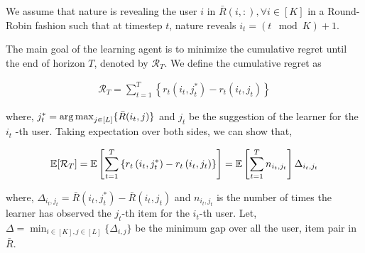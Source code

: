 \begin{assumption}
\label{assm:round-robin}
We assume that nature is revealing the user $i$ in $\bar{R}(i,:), \forall i\in [K]$  in a Round-Robin fashion such that at timestep $t$, nature reveals $i_t = (t \mod K) + 1$.
\end{assumption}

The main goal of the learning agent is to minimize the cumulative regret until the end of horizon $T$, denoted by $\mathcal{R}_T$. We define the cumulative regret as 

\begin{align*}
\mathcal{R}_T = \sum_{t=1}^{T}\left\lbrace r_{t}\left(i_t, j^*_t \right) - r_{t}\left( i_t, j_{t}\right)\right\rbrace
\end{align*}

where, $j^*_t = \mathop{\rm arg\,max}_{j\in [L]}\lbrace \bar{R}(i_t,j)\rbrace$ and $j_t$ be the suggestion of the learner for the $i_t$ -th user. Taking expectation over both sides, we can show that,

\begin{align*}
\mathbb{E}[\mathcal{R}_T] = \mathbb{E}\left [ \sum_{t=1}^{T}\left\lbrace r_{t}\left(i_t, j^*_t \right) - r_{t}\left( i_t, j_{t}\right)\right\rbrace\right] = \mathbb{E}\left [ \sum_{t=1}^{T}  n_{i_t,j_t} \right ]\Delta_{i_t,j_t}
\end{align*}

where, $\Delta_{i_t,j_t} = \bar{R}(i_t,j^*_t) - \bar{R}(i_t,j_t)$ and $n_{i_t,j_t}$ is the number of times the learner has observed the $j_t$-th item for the $i_t$-th user. Let, $\Delta = \min_{i\in[K],j\in[L]}\lbrace \Delta_{i,j}\rbrace$ be the minimum gap over all the user, item pair in $\bar{R}$.
